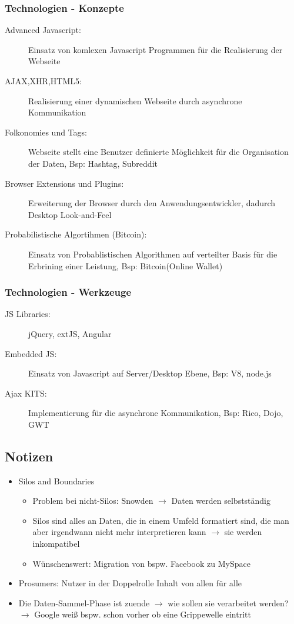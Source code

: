 \documentclass{article} %
\begin{document}
	\subsubsection{Technologien - Konzepte}
	\begin{description}
		\item[Advanced Javascript:] Einsatz von komlexen Javascript Programmen für die Realisierung der Webseite
		\item[AJAX,XHR,HTML5:]  Realisierung einer dynamischen Webseite durch asynchrone Kommunikation
		\item[Folkonomies und Tags:] Webseite stellt eine Benutzer definierte Möglichkeit für die Organisation der Daten, Bsp: Hashtag, Subreddit
		\item[Browser Extensions und Plugins:] Erweiterung der Browser durch den Anwendungsentwickler, dadurch Desktop Look-and-Feel
		\item[Probabilistische Algortihmen (Bitcoin):] Einsatz von Probablistischen Algorithmen auf verteilter Basis für die Erbrining einer Leistung, Bsp: Bitcoin(Online Wallet)
	\end{description}	
	\subsubsection{Technologien - Werkzeuge}
	\begin{description}
		\item[JS Libraries:] jQuery, extJS, Angular
		\item[Embedded JS:] Einsatz von Javascript auf Server/Desktop Ebene, Bsp: V8, node.js
		\item[Ajax KITS:] Implementierung für die asynchrone Kommunikation, Bsp: Rico, Dojo, GWT
	\end{description}
	\subsection{Notizen}
		\begin{itemize}
			\item Silos and Boundaries
				\begin{itemize}
					\item Problem bei nicht-Silos: Snowden $\rightarrow$ Daten werden selbstständig
					\item Silos sind alles an Daten, die in einem Umfeld formatiert sind, die man aber irgendwann nicht mehr interpretieren kann $\rightarrow$ sie werden inkompatibel
					\item Wünschenswert: Migration von bspw. Facebook zu MySpace
				\end{itemize}
				\item Prosumers: Nutzer in der Doppelrolle \glqq Inhalt von allen für alle\grqq
				\item Die Daten-Sammel-Phase ist zuende $\rightarrow$ wie sollen sie verarbeitet werden? $\rightarrow$ Google weiß bspw. schon vorher ob eine Grippewelle eintritt
		\end{itemize}
		
\end{document}
